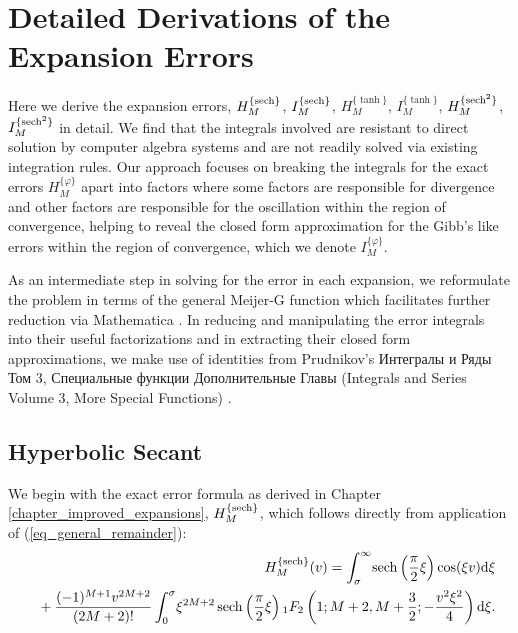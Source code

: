 \section{Detailed Derivations of the Expansion Errors}
\label{appendix_expansion_error_detail}

Here we derive the expansion errors, $H_M^{\{\operatorname{sech}\}}$, $I_M^{\{\operatorname{sech}\}}$,
$H_M^{\{\tanh\}}$, $I_M^{\{\tanh\}}$, $H_M^{\{\operatorname{sech}^2\}}$, $I_M^{\{\operatorname{sech}^2\}}$ in detail.
We find that the integrals involved are resistant to direct solution by computer
algebra systems and are not readily solved via existing integration rules.  Our approach focuses
on breaking the integrals for the exact errors $H_M^{\{\varphi\}}$ apart into factors where
some factors are responsible for divergence and other factors are responsible for the oscillation
within the region of convergence, helping to reveal the closed form approximation for the
Gibb's like errors within the region of convergence, which we denote $I_M^{\{\varphi\}}$.

As an intermediate step in solving for the error in each expansion,
we reformulate the problem in terms of the general Meijer-G function which facilitates further
reduction via Mathematica \cite{Mathematica}.
In reducing and manipulating the error integrals into their useful factorizations
and in extracting their closed form approximations, we make use of identities from
Prudnikov's \foreignlanguage{russian}{Интегралы и Ряды Том 3, Специальные функции 
	Дополнительные Главы} (Integrals and Series Volume 3, More Special Functions) \cite{prudnikov_integrals_2003}.

\subsection{Hyperbolic Secant}
We begin with the exact error formula as derived in Chapter \ref{chapter_improved_expansions}, $H_M^{\{\operatorname{sech}\}}$, which follows directly from application of
(\ref{eq_general_remainder}):
\begin{align}
	\begin{split}
		&H_M^{\{\operatorname{sech}\}}(v) = \int_\sigma^{\infty} \!
		\operatorname{sech}\left(\frac{\pi}{2}\xi\right)
		\cos(\xi v) \mathrm{d}\xi
	\end{split}
	\\
	\begin{split}
		& \quad\quad + \frac{(-1)^{M+1}v^{2M+2}}{(2M+2)!} \int_0^{\sigma} \!
		\xi^{2M+2} \operatorname{sech}\left(\frac{\pi}{2}\xi\right)
		{}_{1}F_{2}\left(1; M+2, M+\frac{3}{2}; -\frac{v^2 \xi^2}{4}\right) \mathrm{d}\xi.
	\end{split}
\end{align}

